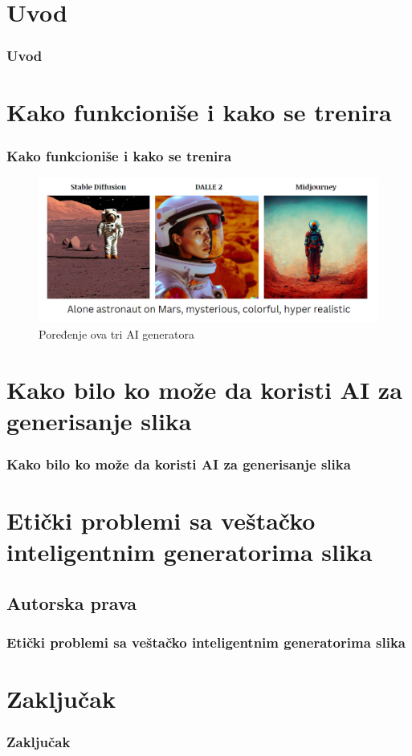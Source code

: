 \documentclass{beamer}
\begin{document}
\section{Uvod} %

\begin{frame}[fragile]\frametitle{Uvod}
	
\end{frame}

\section{Kako funkcioniše i kako se trenira}

\begin{frame}[fragile]\frametitle{Kako funkcioniše i kako se trenira}
	
\begin{figure}[htp]
\centering
\includegraphics[width=1\textwidth]{astronaut.png}
\caption{Poređenje ova tri AI generatora}
\label{fig: Astronaut}
\end{figure}
	
\end{frame}

\section{Kako bilo ko može da koristi AI za generisanje slika}	%

\begin{frame}[fragile]\frametitle{Kako bilo ko može da koristi AI za generisanje slika}
	
\end{frame}

\section{Etički problemi sa veštačko inteligentnim generatorima slika} %
\subsection{Autorska prava}

\begin{frame}[fragile]\frametitle{Etički problemi sa veštačko inteligentnim generatorima slika}
	
\end{frame}

\section{Zaključak} %

\begin{frame}[fragile]\frametitle{Zaključak}
	
\end{frame}
\end{document}

